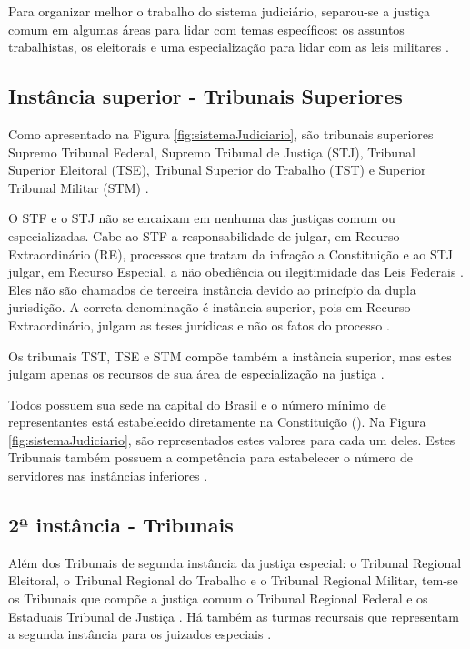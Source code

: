 Para organizar melhor o trabalho do sistema judiciário, separou-se a justiça comum em algumas áreas para lidar com temas específicos: os assuntos trabalhistas, os eleitorais e uma especialização para lidar com as leis militares \cite{JUNIOR2012}. 

\subsection{Instância superior - Tribunais Superiores}

Como apresentado na Figura \ref{fig:sistemaJudiciario}, são tribunais superiores Supremo Tribunal Federal, Supremo Tribunal de Justiça (STJ), Tribunal Superior Eleitoral (TSE), Tribunal Superior do Trabalho (TST) e Superior Tribunal Militar (STM) \cite{BRASIL1988}.

O STF e o STJ não se encaixam em nenhuma das justiças comum ou especializadas. 
Cabe ao STF a responsabilidade de julgar, em Recurso Extraordinário (RE), processos que tratam da infração a Constituição e ao STJ julgar, em Recurso Especial, a não obediência ou ilegitimidade das Leis Federais \cite{BRASIL1988}.
Eles não são chamados de terceira instância devido ao princípio da dupla jurisdição. A correta denominação é instância superior, pois em Recurso Extraordinário, julgam as teses jurídicas e não os fatos do processo \cite{JUNIOR2012}.

Os tribunais TST, TSE e STM compõe também a instância superior, mas estes julgam apenas os recursos de sua área de especialização na justiça \cite{BRASIL1988}.

Todos possuem sua sede na capital do Brasil e o número mínimo de representantes está estabelecido diretamente na Constituição (\citeyear{BRASIL1988}). Na Figura \ref{fig:sistemaJudiciario}, são representados estes valores para cada um deles. Estes Tribunais também possuem a competência para estabelecer o número de servidores nas instâncias inferiores \cite{BRASIL1988}.

\subsection{2ª instância - Tribunais}

Além dos Tribunais de segunda instância da justiça especial: o Tribunal Regional Eleitoral, o Tribunal Regional do Trabalho e o Tribunal Regional Militar, tem-se os Tribunais que compõe a justiça comum o Tribunal Regional Federal e os Estaduais Tribunal de Justiça \cite{BRASIL1988}. Há também as turmas recursais que representam a segunda instância para os juizados especiais \cite{BRASIL2012}.

